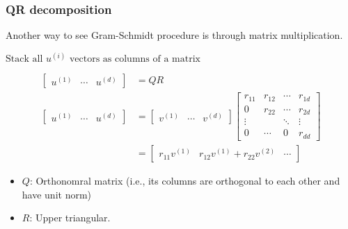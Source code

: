    \subsubsection{QR decomposition}
    Another way to see Gram-Schmidt procedure is through matrix multiplication.
    \begin{definition}
        $\text{Stack all } u^{(i)} \text{ vectors as columns of a matrix}$

        \begin{align*}
            \begin{bmatrix}
            u^{(1)} & \cdots & u^{(d)}
            \end{bmatrix}
            &= QR \\
            \begin{bmatrix}
            u^{(1)} & \cdots & u^{(d)}
            \end{bmatrix}
            &=
            \begin{bmatrix}
            v^{(1)} & \cdots & v^{(d)}
            \end{bmatrix}
            \begin{bmatrix}
            r_{11} & r_{12} & \cdots & r_{1d} \\
            0      & r_{22} & \cdots & r_{2d} \\
            \vdots &        & \ddots & \vdots \\
            0      & \cdots & 0      & r_{dd}
            \end{bmatrix} \\
            &=
            \begin{bmatrix}
            r_{11}v^{(1)} & r_{12}v^{(1)} + r_{22}v^{(2)} & \cdots
            \end{bmatrix}
        \end{align*}        

        \begin{itemize}
            \item \( Q \): Orthonomral matrix (i.e., its columns are orthogonal to each other and have unit norm) 
            \item \( R \): Upper triangular.
        \end{itemize}        
    \end{definition}

